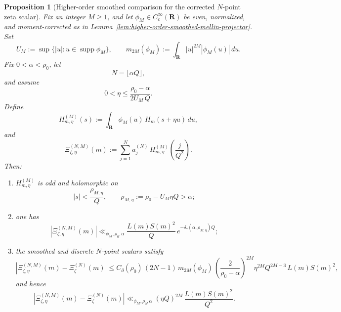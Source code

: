 \documentclass[11pt,a4paper]{amsart}
\theoremstyle{plain}
\newtheorem{proposition}[theorem]{Proposition}
\theoremstyle{definition}
\begin{document}
\begin{proposition}[Higher-order smoothed comparison for the corrected $N$-point zeta scalar]
\label{prop:higher-order-smoothed-zeta-n-point-comparison}
Fix an integer $M\ge 1$, and let $\phi_M\in C_c^\infty(\mathbf R)$ be even,
normalized, and moment-corrected as in
Lemma~\ref{lem:higher-order-smoothed-mellin-projector}. Set
\[
U_M:=\sup\{|u|:u\in \operatorname{supp}\phi_M\},
\qquad
m_{2M}(\phi_M):=\int_{\mathbf R}|u|^{2M}|\phi_M(u)|\,du.
\]
Fix $0<\alpha<\rho_0$, let
\[
N=\lfloor \alpha Q\rfloor,
\]
and assume
\[
0<\eta\le \frac{\rho_0-\alpha}{2U_M\,Q}.
\]
Define
\[
H_{m,\eta}^{(M)}(s):=\int_{\mathbf R}\phi_M(u)\,H_m(s+\eta u)\,du,
\]
and
\[
\Xi_{\zeta,\eta}^{(N,M)}(m)
:=
\sum_{j=1}^N a_j^{(N)}\,H_{m,\eta}^{(M)}\!\left(\frac{j}{Q^2}\right).
\]
Then:

\begin{enumerate}
\item $H_{m,\eta}^{(M)}$ is odd and holomorphic on
\[
|s|<\frac{\rho_{M,\eta}}{Q},
\qquad
\rho_{M,\eta}:=\rho_0-U_M\eta Q>\alpha;
\]

\item one has
\[
|\Xi_{\zeta,\eta}^{(N,M)}(m)|
\ll_{\phi_M,\rho_0,\alpha}
\frac{L(m)S(m)^2}{Q}\,
e^{-\delta_*(\alpha,\rho_{M,\eta})Q};
\]

\item the smoothed and discrete $N$-point scalars satisfy
\[
|\Xi_{\zeta,\eta}^{(N,M)}(m)-\Xi_{\zeta}^{(N)}(m)|
\le
C_{\partial}(\rho_0)\,(2N-1)\,m_{2M}(\phi_M)\,
\left(\frac{2}{\rho_0-\alpha}\right)^{2M}
\eta^{2M}Q^{2M-3}\,
L(m)S(m)^2,
\]
and hence
\[
|\Xi_{\zeta,\eta}^{(N,M)}(m)-\Xi_{\zeta}^{(N)}(m)|
\ll_{\phi_M,\rho_0,\alpha}
(\eta Q)^{2M}\,\frac{L(m)S(m)^2}{Q^2}.
\]
\end{enumerate}
\end{proposition}
\end{document}
